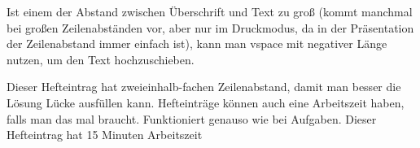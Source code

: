 {
    \ifbeamer\else\vspace{-0.6cm}\fi
    
    Ist einem der Abstand zwischen Überschrift und Text zu groß (kommt manchmal bei großen Zeilenabständen vor, aber nur im Druckmodus, da in der Präsentation der Zeilenabstand immer einfach ist), kann man vspace mit negativer Länge nutzen, um den Text hochzuschieben.

    Dieser Hefteintrag hat zweieinhalb-fachen Zeilenabstand, damit man besser die Lösung Lücke ausfüllen kann. Hefteinträge können auch eine Arbeitszeit haben, falls man das mal braucht. Funktioniert genauso wie bei Aufgaben. Dieser Hefteintrag hat 15 Minuten Arbeitszeit
}